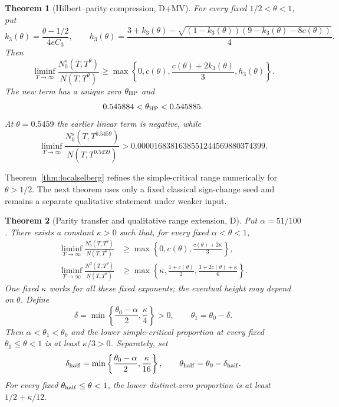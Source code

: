 \documentclass[11pt]{article}
\newtheorem{theorem}{Theorem}[section]
\theoremstyle{remark}
\begin{document}
\begin{theorem}[Hilbert--parity compression, D+MV]
\label{thm:hilbertparity}
For every fixed $1/2<\theta<1$, put
\[
 k_3(\theta)=\frac{\theta-1/2}{4eC_3},\qquad
 h_3(\theta)=\frac{3+k_3(\theta)-
 \sqrt{(1-k_3(\theta))(9-k_3(\theta)-8c(\theta))}}4.
\]
Then
\begin{equation}\label{eq:hilbertsimple}
 \liminf_{T\to\infty}\frac{N_0^s(T,T^\theta)}{N(T,T^\theta)}
 \ge\max\left\{0,c(\theta),\frac{c(\theta)+2k_3(\theta)}3,
 h_3(\theta)\right\}.
\end{equation}
The new term has a unique zero $\theta_{\rm HP}$ and
\begin{equation}\label{eq:hproot}
 0.545884<\theta_{\rm HP}<0.545885.
\end{equation}
At $\theta=0.5459$ the earlier linear term is negative, while
\begin{equation}\label{eq:hppoint}
 \liminf_{T\to\infty}\frac{N_0^s(T,T^{0.5459})}{N(T,T^{0.5459})}
 >0.0000168381638551244569880374399.
\end{equation}
\end{theorem}

Theorem~\ref{thm:localselberg} refines the simple-critical range numerically
for $\theta>1/2$. The next theorem uses only a fixed classical sign-change
seed and remains a separate qualitative statement under weaker input.

\begin{theorem}[Parity transfer and qualitative range extension, D]
\label{thm:parity}
Put $\alpha=51/100$. There exists a constant $\kappa>0$ such that, for
every fixed $\alpha<\theta<1$,
\begin{align}
\liminf_{T\to\infty}\frac{N_0^s(T,T^\theta)}{N(T,T^\theta)}
&\ge\max\left\{0,c(\theta),\frac{c(\theta)+2\kappa}{3}\right\},
\label{eq:paritysimple}\\
\liminf_{T\to\infty}\frac{N^d(T,T^\theta)}{N(T,T^\theta)}
&\ge\max\left\{\kappa,\frac{1+c(\theta)}2,
                    \frac{3+2c(\theta)+\kappa}{6}\right\}.
\label{eq:paritydistinct}
\end{align}
One fixed $\kappa$ works for all these fixed exponents; the eventual height
may depend on $\theta$. Define
\begin{equation}\label{eq:paritydelta}
\delta=\min\left\{\frac{\theta_0-\alpha}{2},\frac\kappa4\right\}>0,
\qquad \theta_1=\theta_0-\delta.
\end{equation}
Then $\alpha<\theta_1<\theta_0$ and the lower simple-critical proportion
at every fixed $\theta_1\le\theta<1$ is at least $\kappa/3>0$.
Separately, set
\begin{equation}\label{eq:halfdelta}
\delta_{\rm half}=\min\left\{\frac{\theta_0-\alpha}{2},
                                      \frac\kappa{16}\right\},
\qquad \theta_{\rm half}=\theta_0-\delta_{\rm half}.
\end{equation}
For every fixed $\theta_{\rm half}\le\theta<1$, the lower distinct-zero
proportion is at least $1/2+\kappa/12$.
\end{theorem}
\end{document}
